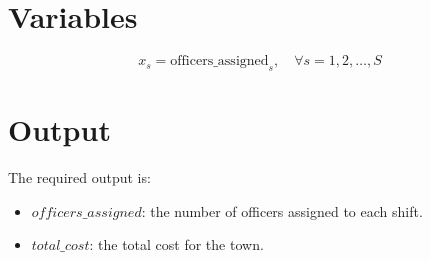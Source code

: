 \documentclass{article}
\begin{document}
\section*{Variables}

\[
x_s = \text{officers\_assigned}_{s}, \quad \forall s = 1, 2, \ldots, S
\]

\section*{Output}

The required output is:

\begin{itemize}
    \item \( officers\_assigned \): the number of officers assigned to each shift.
    \item \( total\_cost \): the total cost for the town.
\end{itemize}
\end{document}
